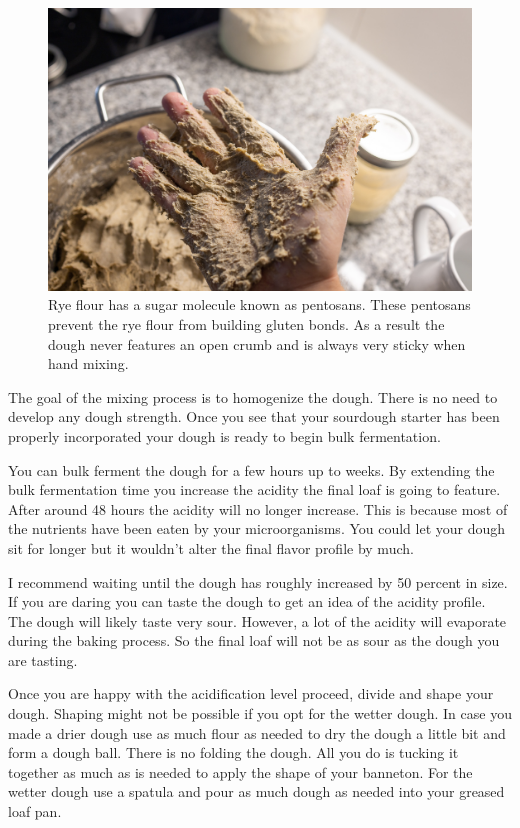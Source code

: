 \begin{figure}[!htb]
  \includegraphics[width=\textwidth]{sticky-hands}
  \caption{Rye flour has a sugar molecule known as pentosans. These pentosans prevent
  the rye flour from building gluten bonds. As a result the dough never features an
  open crumb and is always very sticky when hand mixing.}
  \label{fig:non-wheat-sticky-hands}
\end{figure}

The goal of the mixing process is to homogenize the dough. There
is no need to develop any dough strength. Once you see that
your sourdough starter has been properly incorporated your
dough is ready to begin bulk fermentation.

You can bulk ferment the dough for a few hours up to
weeks. By extending the bulk fermentation time you increase
the acidity the final loaf is going to feature. After around
48 hours the acidity will no longer increase. This is because
most of the nutrients have been eaten by your microorganisms.
You could let your dough sit for longer but it wouldn't alter the
final flavor profile by much.

I recommend waiting until the dough has roughly increased by
50 percent in size. If you are daring you can taste the dough
to get an idea of the acidity profile. The dough will likely
taste very sour. However, a lot of the acidity will evaporate
during the baking process. So the final loaf will not be
as sour as the dough you are tasting.

Once you are happy with the acidification level proceed, divide
and shape your dough. Shaping might not be possible if you opt
for the wetter dough. In case you made a drier dough use as much
flour as needed to dry the dough a little bit and form a dough ball.
There is no folding the dough. All you do is tucking it together
as much as is needed to apply the shape of your banneton.
For the wetter dough use a spatula and pour as much dough as
needed into your greased loaf pan.

